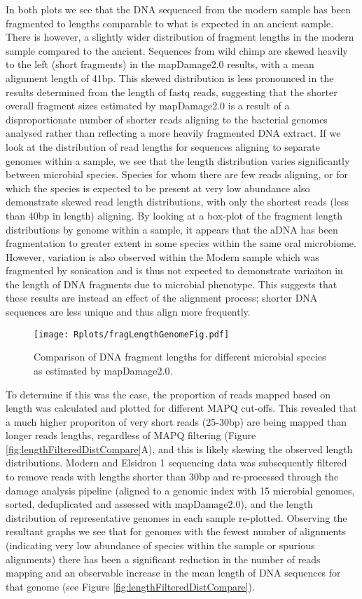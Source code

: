 \documentclass[12pt, a4paper]{article}
\begin{document}
In both plots we see that the DNA sequenced from the modern sample has been fragmented to lengths comparable to what is expected in an ancient sample. 
There is however, a slightly wider distribution of fragment lengths in the modern sample compared to the ancient. 
Sequences from wild chimp are skewed heavily to the left (short fragments) in the mapDamage2.0 results, with a mean alignment length of 41bp. 
This skewed distribution is less pronounced in the results determined from the length of fastq reads, suggesting that the shorter overall fragment sizes estimated by mapDamage2.0 is a result of a disproportionate number of shorter reads aligning to the bacterial genomes analysed rather than  reflecting a more heavily fragmented DNA extract. 
If we look at the distribution of read lengths for sequences aligning to separate genomes within a sample, we see that the length distribution varies significantly between microbial species. 
Species for whom there are few reads aligning, or for which the species is expected to be present at very low abundance also demonstrate skewed read length distributions, with only the shortest reads (less than 40bp in length) aligning. 
By looking at a box-plot of the fragment length distributions by genome within a sample, it appears that the aDNA has been fragmentation to greater extent in some species within the same oral microbiome. 
However, variation is also observed within the Modern sample which was fragmented by sonication and is thus not expected to demonstrate variaiton in the length of DNA fragments due to microbial phenotype. 
This suggests that these results are instead an effect of the alignment process; shorter DNA sequences are less unique and thus align more frequently. 

\begin{figure}[ht!]
	\centering
	\texttt{[image: Rplots/fragLengthGenomeFig.pdf]}
	\small\caption{Comparison of DNA fragment lengths for different microbial species as estimated by mapDamage2.0.}\label{fig:lengthDistCompare}
\end{figure} 

To determine if this was the case, the proportion of reads mapped based on length was calculated and plotted for different MAPQ cut-offs. 
This revealed that a much higher proporiton of very short reads (25-30bp) are being mapped than longer reads lengths, regardless of MAPQ filtering (Figure \ref{fig:lengthFilteredDistCompare}A), and this is likely skewing the observed length distributions. 
Modern and Elsidron 1 sequencing data was subsequently filtered to remove reads with lengths shorter than 30bp and re-processed through the damage analysis pipeline (aligned to a genomic index with 15 microbial genomes, sorted, deduplicated and assessed with mapDamage2.0), and the length distribution of representative genomes in each sample re-plotted. 
Observing the resultant graphs we see that for genomes with the fewest number of alignments (indicating very low abundance of species within the sample or spurious alignments) there has been a significant reduction in the number of reads mapping and an observable increase in the mean length of DNA sequences for that genome (see Figure \ref{fig:lengthFilteredDistCompare}).
\end{document}
